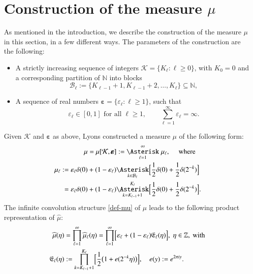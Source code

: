 \documentclass[12pt, twoside]{article}
\theoremstyle{definition}
\numberwithin{equation}{section}
\begin{document}
\section{Construction of the measure $\mu$} \label{mu-construction-section} 
As mentioned in the introduction, we describe the construction of the measure $\mu$ in this section, in a few different ways. The parameters of the construction are the following:
\begin{itemize} 
\item A strictly increasing sequence of integers $\mathcal K = \{K_{\ell} : \ell \geq 0\}$,  with $K_0 =0$ and a corresponding partition of $\mathbb N$ into blocks 
\begin{equation} \label{block-def}  
\mathcal B_{\ell} := \{ K_{\ell-1}+1, K_{\ell-1}+2, \ldots, K_{\ell}\} \subseteq \mathbb N,
\end{equation} 
\item A sequence of real numbers $\pmb{\varepsilon} = \{\varepsilon_{\ell} : \ell \geq 1\}$, such that 
\begin{equation}  \varepsilon_{\ell} \in [0, 1] \text{ for all } \ell \geq 1, \qquad \sum_{\ell=1}^{\infty} \varepsilon_{\ell} = \infty.
\label{epsilon-assumption} \end{equation} 
\end{itemize} 
Given $\mathcal K$ and $\pmb{\varepsilon}$ as above, Lyons \cite{l86} constructed a measure $\mu$ of the following form: 
\begin{equation} \label{def-mu} 
\begin{aligned} 
\mu &= \mu[\mathcal K, \pmb{\varepsilon}] := \overset{\infty}{\underset{\ell=1}{\Asterisk}} \; \mu_{\ell}, \quad \text{ where } \\   
\mu_{\ell} := \varepsilon_{\ell} \delta(0) &+ (1 - \varepsilon_{\ell}) {\underset{k \in \mathcal B_{\ell}}{\Asterisk}} \Bigl[\frac{1}{2} \delta(0) + \frac{1}{2} \delta(2^{-k}) \Bigr] \\ 
= \varepsilon_{\ell} \delta(0) &+ (1 - \varepsilon_{\ell}) 
 {\underset{k=K_{\ell-1}+1}{\overset{K_{\ell}}{\Asterisk}}} \Bigl[\frac{1}{2} \delta(0) + \frac{1}{2} \delta(2^{-k}) \Bigr].
\end{aligned} 
\end{equation}
The infinite convolution structure \eqref{def-mu} of $\mu$ leads to the following product representation of $\widehat{\mu}$: 
\begin{align} \label{mu-hat-infinite-product} 
\widehat{\mu}(\eta) &= \prod_{\ell=1}^{\infty} \widehat{\mu}_{\ell}(\eta) = \prod_{\ell=1}^{\infty} \Bigl[ \varepsilon_{\ell} + (1 - \varepsilon_{\ell}) \mathfrak E_{\ell}(\eta) \Bigr], \; \eta \in \mathbb Z, \text{ with } \\ 
\mathfrak E_{\ell}(\eta) &:= \prod_{k = K_{\ell-1}+1}^{K_{\ell}} \Bigl[ \frac{1}{2} \bigl( 1 + e(2^{-k} \eta) \bigr) \Bigr], \quad e(y) := e^{2 \pi i y}. \label{def-El}
\end{align} 
\end{document}
